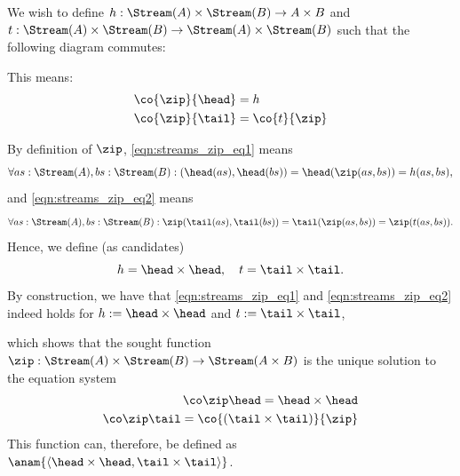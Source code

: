 \begin{solution}\label{sol:zip}

We wish to define $h : \Stream(A)\times\Stream(B)\to A\times B$ and $t: \Stream(A)\times\Stream(B)\to \Stream(A)\times \Stream(B)$ such that the following diagram commutes:
	\begin{center}
	\end{center}
	
	This means:
	\begin{align}
	\co{\zip}{\head} &= h \label{eqn:streams_zip_eq1} \\
	\co{\zip}{\tail} &= \co{t}{\zip} \label{eqn:streams_zip_eq2} 
	\end{align}
	
	By definition of $\zip$, \cref{eqn:streams_zip_eq1} means
	\[
	\forall as : \Stream(A), bs : \Stream(B): (\head(as),\head(bs)) = \head(\zip(as,bs)) = h(as,bs),
	\]
	and \cref{eqn:streams_zip_eq2} means
	\[
	\forall as : \Stream(A), bs : \Stream(B): \zip (\tail(as),\tail(bs)) = \tail(\zip(as,bs)) = \zip (t(as,bs)).
	\]
	Hence, we define (as candidates)
	\[
	h = \head\times\head, \quad t = \tail\times\tail.
	\]
	By construction, we have that \cref{eqn:streams_zip_eq1} and \cref{eqn:streams_zip_eq2} indeed holds for $h := \head\times\head$ and $t := \tail\times\tail$, 

  which shows that the sought function $\zip : \Stream(A) \times \Stream(B) \to \Stream(A\times B)$ is the unique solution to the equation system
  \begin{align*}
    \co \zip \head = \head\times\head
    \\
    \co \zip \tail = \co{(\tail\times\tail)}{\zip}
  \end{align*}
  This function can, therefore, be defined as $\anam{ {\langle \head \times \head, \tail \times \tail \rangle} }$.
\end{solution}


